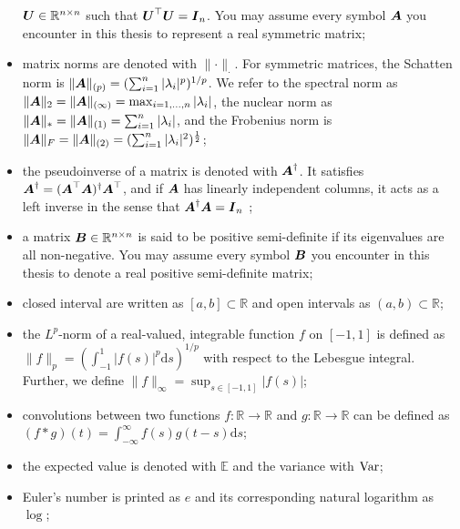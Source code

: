 \begin{itemize}
          $\boldsymbol{U} \in \mathbb{R}^{n \times n}$ such that $\boldsymbol{U}^{\top} \boldsymbol{U} = \boldsymbol{I}_n$.
          You may assume every symbol $\boldsymbol{A}$ you encounter in this thesis to
          represent a real symmetric matrix;
    \item matrix norms are denoted with $\lVert \cdot \rVert _{\cdot}$.
          For symmetric matrices, the Schatten norm is
          $\lVert \boldsymbol{A} \rVert _{(p)} = (\sum_{i=1}^n |\lambda_i|^p)^{1/p}$.
          We refer to the spectral norm as
          $\lVert \boldsymbol{A} \rVert _2 = \lVert \boldsymbol{A} \rVert _{(\infty)} = \max_{i=1,\dots,n}|\lambda_i|$,
          the nuclear norm as $\lVert \boldsymbol{A} \rVert _{\ast} = \lVert \boldsymbol{A} \rVert _{(1)} = \sum_{i=1}^{n} |\lambda_i|$,
          and the Frobenius norm
          is $\lVert \boldsymbol{A} \rVert _F = \lVert \boldsymbol{A} \rVert _{(2)} = (\sum_{i=1}^{n} |\lambda_i|^2)^{\frac{1}{2}}$;
    \item the pseudoinverse of a matrix is denoted with $\boldsymbol{A}^{\dagger}$. It
          satisfies $\boldsymbol{A}^{\dagger}=(\boldsymbol{A}^{\top} \boldsymbol{A})^{\dagger} \boldsymbol{A}^{\top}$,
          and if $\boldsymbol{A}$ has linearly independent columns, it acts as a left inverse
          in the sense that $\boldsymbol{A}^{\dagger} \boldsymbol{A} = \boldsymbol{I}_n$ \cite{penrose1955pseudo};
    \item a matrix $\boldsymbol{B} \in \mathbb{R}^{n \times n}$ is said to be positive
          semi-definite if its eigenvalues are all non-negative. You may assume every
          symbol $\boldsymbol{B}$ you encounter in this thesis to denote a real positive
          semi-definite matrix;
    \item closed interval are written as $[a, b] \subset \mathbb{R}$ and open
          intervals as $(a, b) \subset \mathbb{R}$;
    \item the $L^p$-norm of a real-valued, integrable function $f$ on $[-1, 1]$ is defined as
          $\lVert f \rVert _{p} = (\int_{-1}^{1} |f(s)|^p \mathrm{d}s)^{1/p}$ with
          respect to the Lebesgue integral. Further, we define $\lVert f \rVert _{\infty} = \sup_{s \in [-1, 1]} |f(s)|$;
    \item convolutions between two functions $f:\mathbb{R} \to \mathbb{R}$ and $g:\mathbb{R} \to \mathbb{R}$
          can be defined as $(f \ast g)(t) = \int_{-\infty}^{\infty}f(s)g(t-s)\mathrm{d}s$;
    \item the expected value is denoted with $\mathbb{E}$ and the variance with $\operatorname{Var}$;
    \item Euler's number is printed as $e$ and its corresponding natural logarithm as $\log$;

\end{itemize}
